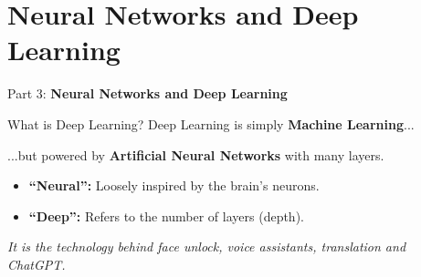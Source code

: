 \section{Neural Networks and Deep Learning}
\begin{frame}{}
    \LARGE Part 3: \textbf{Neural Networks and Deep Learning}
\end{frame}

\begin{frame}{What is Deep Learning?}
    \centering
    \Large
    Deep Learning is simply \textbf{Machine Learning}...

    \vspace{0.5em}
    ...but powered by \textbf{Artificial Neural Networks} with many layers.

    \vspace{1.5em}
    \normalsize
    \begin{itemize}
        \item \textbf{``Neural'':} Loosely inspired by the brain's neurons.
        \item \textbf{``Deep'':} Refers to the number of layers (depth).
    \end{itemize}

    \vspace{1em}
    \textit{It is the technology behind face unlock, voice assistants, translation and ChatGPT.}
\end{frame}

